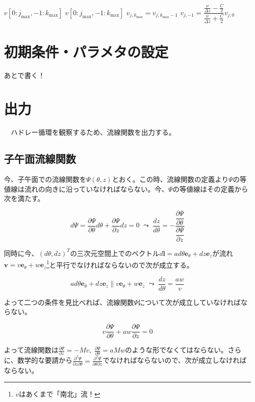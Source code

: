 \documentclass[ja=standard,xelatex]{bxjsarticle}
\newcommand{\vs}[1]{\vskip#1\baselineskip}
\newcommand{\neqn}[1]{\begin{equation}{#1}\end{equation}}
\newcommand{\dif}[2]{\dfrac{d#1}{d#2}}
\newcommand{\pdif}[2]{\dfrac{\partial{#1}}{\partial#2}}
\newcommand{\vect}[1]{\mathbf{#1}}
\newcommand{\bracketnormal}[1]{\left(#1\right)}
\begin{document}
\vs{0.5}

\begin{algorithm}[H]
  \caption*{\textbf{subroutine:} update\_boundary\_v}
  \begin{algorithmic}[1]
    \Require $v[0:j_\text{max},-1:k_\text{max}]$
    \Ensure $v[0:j_\text{max},-1:k_\text{max}]$
    \Statex
    \State {}
    \State $v_{j,k_\text{max}} = v_{j,k_\text{max}-1}$
    \State $v_{j,-1} = \dfrac{\frac{\nu}{\Delta z}-\frac{C}{2}}{\frac{\nu}{\Delta z}+\frac{C}{2}}v_{j,0}$
    \EndDo
  \end{algorithmic}
\end{algorithm}

\section{初期条件・パラメタの設定}
{\color{red}あとで書く！}

\section{出力}
　ハドレー循環を観察するため、流線関数を出力する。

\subsection{子午面流線関数}
今、子午面での流線関数を$\Psi\bracketnormal{\theta,z}$とおく。この時、流線関数の定義より$\Psi$の等値線は流れの向きに沿っていなければならない。今、$\Psi$の等値線はその定義から次を満たす。

\neqn{
  d\Psi = \pdif{\Psi}{\theta}d\theta + \pdif{\Psi}{z}dz = 0 \; \leadsto \; \dif{z}{\theta} = -\dfrac{\pdif{\Psi}{\theta}}{\pdif{\Psi}{z}}
}

同時に今、$\bracketnormal{d\theta ,dz}^T$の三次元空間上でのベクトル$d\vect{l} = ad\theta\vect{e}_\theta + dz\vect{e}_z$が流れ$\vect{v} = v\vect{e}_\theta + w\vect{e}_z$\footnote{
  $v$はあくまで「南北」流！
}と平行でなければならないので次が成立する。

\neqn{
  ad\theta\vect{e}_\theta + dz\vect{e}_z \parallel v\vect{e}_\theta + w\vect{e}_z\;\leadsto \; \dif{z}{\theta} = \dfrac{aw}{v}
}

よって二つの条件を見比べれば、流線関数$\Psi$について次が成立していなければならない。

\neqn{
  v\pdif{\Psi}{\theta} + aw\pdif{\Psi}{z} = 0
}

よって流線関数は$\frac{\partial \Psi}{\partial z} = -Mv,\; \frac{\partial \Psi}{\partial \theta} = aMw$のような形でなくてはならない。さらに、数学的な要請から$\frac{\partial^2 \Psi}{\partial z\partial\theta} = \frac{\partial^2 \Psi}{\partial \theta\partial z}$でなければならないので、次が成立しなければならない。
\end{document}
